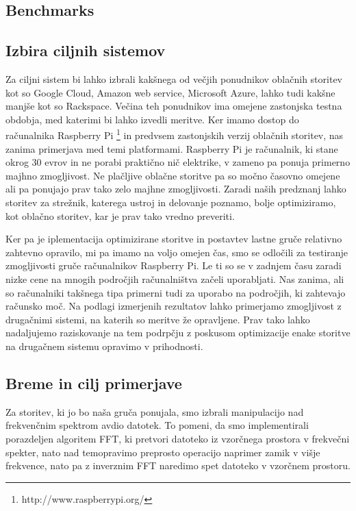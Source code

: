 \subsection{Benchmarks}

\subsection{Izbira ciljnih sistemov}

Za ciljni sistem bi lahko izbrali kakšnega od večjih ponudnikov oblačnih storitev kot so Google Cloud, Amazon web service, Microsoft Azure, lahko tudi kakšne manjše kot so Rackspace. Večina teh ponudnikov ima omejene zastonjska testna obdobja, med katerimi bi lahko izvedli meritve.
Ker imamo dostop do računalnika Raspberry Pi \footnote{http://www.raspberrypi.org/} in predvsem zastonjskih verzij oblačnih storitev, nas zanima primerjava med temi platformami. Raspberry Pi je računalnik, ki stane okrog 30 evrov in ne porabi praktično nič elektrike, v zameno pa ponuja primerno majhno zmogljivost. Ne plačljive oblačne storitve pa so močno časovno omejene ali pa ponujajo prav tako zelo majhne zmogljivosti.
Zaradi naših predznanj lahko storitev za strežnik, katerega ustroj in delovanje poznamo, bolje optimiziramo, kot oblačno storitev, kar je prav tako vredno preveriti.

Ker pa je iplementacija optimizirane storitve in postavtev lastne gruče relativno zahtevno opravilo, mi pa imamo na voljo omejen čas, smo se odločili za testiranje zmogljivosti gruče računalnikov Raspberry Pi. Le ti so se v zadnjem času zaradi nizke cene na mnogih področjih računalništva začeli uporabljati. Nas zanima, ali so računalniki takšnega tipa primerni tudi za uporabo na področjih, ki zahtevajo računsko moč. Na podlagi izmerjenih rezultatov lahko primerjamo zmogljivost z drugačnimi sistemi, na katerih so meritve že opravljene. Prav tako lahko nadaljujemo raziskovanje na tem podrpčju z poskusom optimizacije enake storitve na drugačnem sistemu opravimo v prihodnosti.

\subsection{Breme in cilj primerjave}

Za storitev, ki jo bo naša gruča ponujala, smo izbrali manipulacijo nad frekvenčnim spektrom avdio datotek. To pomeni, da smo implementirali porazdeljen algoritem FFT, ki pretvori datoteko iz vzorčnega prostora v frekvečni spekter, nato nad temopravimo preprosto operacijo naprimer zamik v višje frekvence, nato pa z inverznim FFT naredimo spet datoteko v vzorčnem prostoru.

